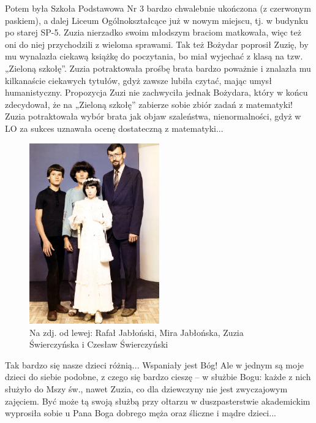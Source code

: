 Potem była Szkoła Podstawowa Nr 3 bardzo chwalebnie ukończona (z czerwonym paskiem), a dalej Liceum Ogólnokształcące już w nowym miejscu, tj. w budynku po starej SP-5. Zuzia nierzadko swoim młodszym braciom matkowała, więc też oni do niej przychodzili z wieloma sprawami. Tak też Bożydar poprosił Zuzię, by mu wynalazła ciekawą książkę do poczytania, bo miał wyjechać z klasą na tzw. „Zieloną szkołę”. Zuzia potraktowała prośbę brata bardzo poważnie i znalazła mu kilkanaście ciekawych tytułów, gdyż zawsze lubiła czytać, mając umysł humanistyczny. Propozycja Zuzi nie zachwyciła jednak Bożydara, który w końcu zdecydował, że na „Zieloną szkołę” zabierze sobie zbiór zadań z matematyki! Zuzia potraktowała wybór brata jak objaw szaleństwa, nienormalności, gdyż w LO za sukces uznawała ocenę dostateczną z matematyki...
\begin{figure}[!h]
\begin{center}
\includegraphics[width=0.5\textwidth]{photo/zuzia_swierczynska_komunia.jpg}
\caption[I Komunia św. Zuzi Świerczyńskiej]{Na zdj. od lewej: Rafał Jabłoński, Mira Jabłońska, Zuzia Świerczyńska i Czesław Świerczyński}
\end{center}
\end{figure}

Tak bardzo się nasze dzieci różnią... Wspaniały jest Bóg! Ale w jednym są moje dzieci do siebie podobne, z czego się bardzo cieszę – w służbie Bogu: każde z nich służyło do Mszy św., nawet Zuzia, co dla dziewczyny nie jest zwyczajowym zajęciem. Być może tą swoją służbą przy ołtarzu w duszpasterstwie akademickim wyprosiła sobie u Pana Boga dobrego męża oraz  śliczne i mądre dzieci...

